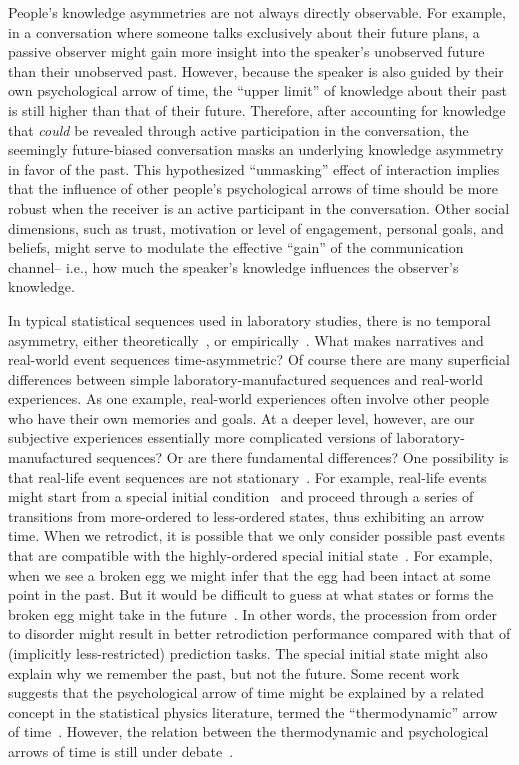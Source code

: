 \documentclass[10pt]{article}
\begin{document}
People's knowledge asymmetries are not always directly observable.  For example, in a conversation where someone talks exclusively about their future plans, a passive observer might gain more insight into the speaker's unobserved future than their unobserved past.  However, because the speaker is also guided by their own psychological arrow of time, the ``upper limit'' of knowledge about their past is still higher than that of their future.  Therefore, after accounting for knowledge that \textit{could} be revealed through active participation in the conversation, the seemingly future-biased conversation masks an underlying knowledge asymmetry in favor of the past.  This hypothesized ``unmasking'' effect of interaction implies that the influence of other people's psychological arrows of time should be more robust when the receiver is an active participant in the conversation.  Other social dimensions, such as trust, motivation or level of engagement, personal goals, and beliefs, might serve to modulate the effective ``gain'' of the communication channel-- i.e., how much the speaker's knowledge influences the observer's knowledge.

In typical statistical sequences used in laboratory studies, there is no temporal asymmetry, either theoretically~\citep{Cove94, BialEtal01, ElliEtal09}, or empirically~\citep{JonePash07}. What makes narratives and real-world event sequences time-asymmetric? Of course there are many superficial differences between simple laboratory-manufactured sequences and real-world experiences.  As one example, real-world experiences often involve other people who have their own memories and goals.  At a deeper level, however, are our subjective experiences essentially more complicated versions of laboratory-manufactured sequences?  Or are there fundamental differences?  One possibility is that real-life event sequences are not stationary~\citep[i.e., not in equilibrium,][]{Cove94}. For example, real-life events might start from a special initial condition~\citep{Albe00, Feyn65, Cove94} and proceed through a series of transitions from more-ordered to less-ordered states, thus exhibiting an arrow time. When we retrodict, it is possible that we only consider possible past events that are compatible with the highly-ordered special initial state~\citep{Carr10, Carr16}.  For example, when we see a broken egg we might infer that the egg had been intact at some point in the past.  But it would be difficult to guess at what states or forms the broken egg might take in the future~\citep{Carr10, Carr16}.  In other words, the procession from order to disorder might result in better retrodiction performance compared with that of (implicitly less-restricted) prediction tasks. The special initial state might also explain why we remember the past, but not the future. Some recent work suggests that the psychological arrow of time might be explained by a related concept in the statistical physics literature, termed the ``thermodynamic'' arrow of time~\citep{MlodBrun14, Rove22}. However, the relation between the thermodynamic and psychological arrows of time is still under debate~\citep{Golo21, HemmShen19}. 
\end{document}
